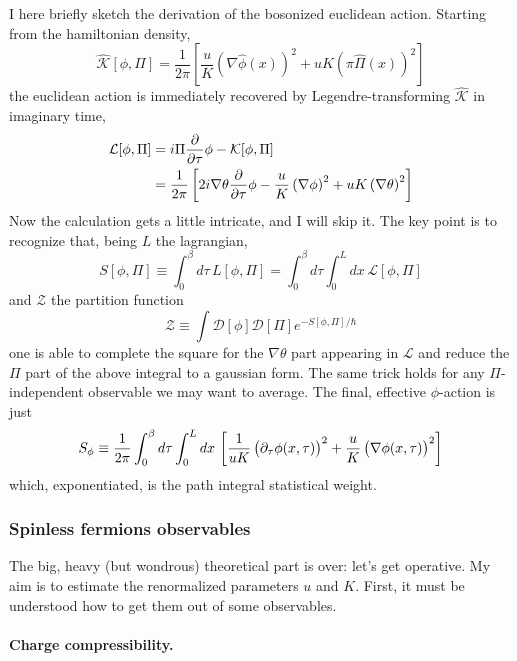 I here briefly sketch the derivation of the bosonized euclidean action. Starting from the hamiltonian density,
\[
	\hat{\mathcal{K}}[\phi, \Pi] = \frac{1}{2\pi} \left[
			\frac{u}{K} \left( \nabla \hat \phi(x) \right)^2 + uK \left( \pi \hat \Pi(x) \right)^2
	\right]
\]
the euclidean action is immediately recovered by Legendre-transforming $\hat{\mathcal{K}}$ in imaginary time,
\[
	\begin{aligned}
		\mathcal{L}[\phi, \Pi] &= i \Pi \pdv{\tau} \phi - \mathcal{K} [\phi, \Pi] \\
		&= \frac{1}{2\pi} \left[
			2i \nabla \theta \pdv{\tau} \phi
			- \frac{u}{K} \left( \nabla \phi \right)^2 + uK \left( \nabla \theta \right)^2
		\right]
	\end{aligned}
\]
Now the calculation gets a little intricate, and I will skip it. The key point is to recognize that, being $L$ the lagrangian,
\[
	S[\phi, \Pi] \equiv \int_0^\beta d\tau \, L[\phi, \Pi] = \int_0^\beta d\tau \int_0^L dx \,  \mathcal{L}[\phi, \Pi]
\]
and $\mathcal{Z}$ the partition function
\[
	\mathcal{Z} \equiv \int \mathcal{D}[\phi] \mathcal{D}[\Pi] e^{-S[\phi, \Pi] /\hbar}
\]
one is able to complete the square for the $\nabla \theta$ part appearing in $\mathcal{L}$ and reduce the $\Pi$ part of the above integral to a gaussian form. The same trick holds for any $\Pi$-independent observable we may want to average. The final, effective $\phi$-action is just
\begin{equation}\label{eq:phi-action}
	S_\phi \equiv \frac{1}{2\pi} \int_0^\beta d\tau \int_0^L dx \, \left[
		\frac{1}{uK} \left(
			\vphantom{A^A}
			\partial_\tau \phi(x,\tau)
		\right)^2 + \frac{u}{K} \left(
			\vphantom{A^A}
			\nabla \phi(x,\tau) 
		\right)^2
	\right]
\end{equation}
which, exponentiated, is the path integral statistical weight.

\subsubsection{Spinless fermions observables}\label{subsubsec:spinless-fermions-observables}

The big, heavy (but wondrous) theoretical part is over: let's get operative. My aim is to estimate the renormalized parameters $u$ and $K$. First, it must be understood how to get them out of some observables.

\paragraph{Charge compressibility.}

